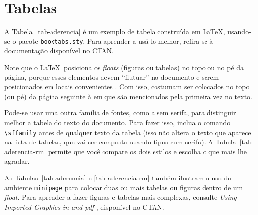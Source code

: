 \section{Tabelas}

A Tabela~\ref{tab-aderencia} é um exemplo de tabela construída em
\LaTeX, usando-se o pacote \verb|booktabs.sty|. Para aprender a usá-lo melhor, refira-se à documentação disponível no CTAN. 

Note que o \LaTeX\ posiciona os \emph{floats} 
(figuras ou tabelas) no topo ou no pé da página, porque esses elementos devem ``flutuar''
no documento e serem posicionados em locais convenientes \cite[p.~59]{LaTeX}. Com isso, costumam
ser colocados no topo (ou pé) da página seguinte à em que são mencionados pela 
primeira vez no texto. 

Pode-se usar uma outra família de fontes, como a sem serifa, para distinguir melhor a tabela
do texto do documento. Para fazer isso, inclua o comando \verb|\sffamily| antes de qualquer
texto da tabela (isso não altera o texto que aparece na lista de tabelas, que vai 
ser composto usando tipos com serifa).  A Tabela~\ref{tab-aderencia-rm} permite que você
compare os dois estilos e escolha o que mais lhe agradar.

As Tabelas~\ref{tab-aderencia} e \ref{tab-aderencia-rm} também ilustram o uso 
do ambiente \verb|minipage| para colocar duas ou mais tabelas ou figuras dentro
de um \emph{float}. Para aprender a fazer figuras e tabelas mais complexas,
consulte \emph{Using Imported Graphics in \protect{\LaTeX} and pdf\protect{\LaTeX}} \cite{epslatex06}, disponível no CTAN.

